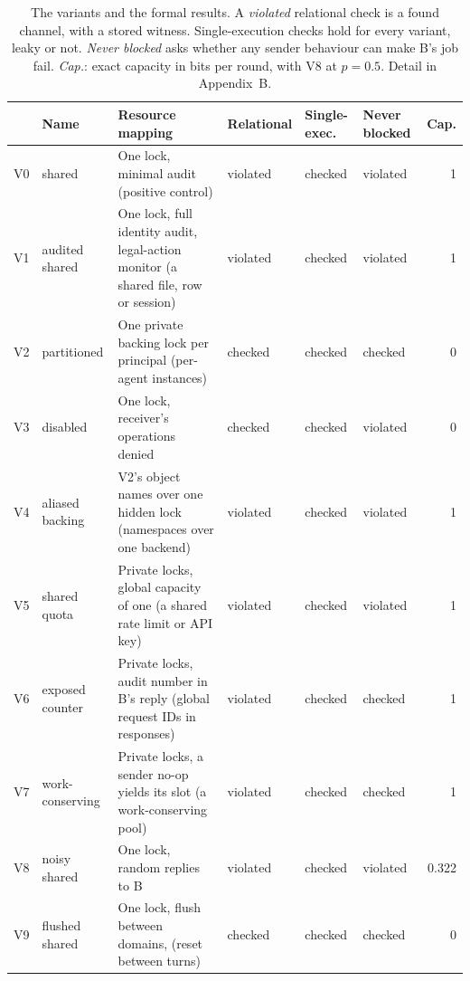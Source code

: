 \begin{table}[!t]
\centering\footnotesize
\caption{The variants and the formal results. A \emph{violated} relational check is a found channel, with a stored witness. Single-execution checks hold for every variant, leaky or not. \emph{Never blocked} asks whether any sender behaviour can make B's job fail. \emph{Cap.}: exact capacity in bits per round, with V8 at $p=0.5$. Detail in Appendix~B.}
\label{tab:variants}
\setlength{\tabcolsep}{3pt}
\begin{tabularx}{\textwidth}{@{}l l Y l l l r@{}}
\toprule
& \textbf{Name} & \textbf{Resource mapping} & \textbf{Relational} & \textbf{Single-exec.} & \textbf{Never blocked} & \textbf{Cap.}\\
\midrule
V0 & shared & One lock, minimal audit (positive control) & violated & checked & violated & 1 \\
V1 & audited shared & One lock, full identity audit, legal-action monitor (a shared file, row or session) & violated & checked & violated & 1 \\
V2 & partitioned & One private backing lock per principal (per-agent instances) & checked & checked & checked & 0 \\
V3 & disabled & One lock, receiver's operations denied & checked & checked & violated & 0 \\
V4 & aliased backing & V2's object names over one hidden lock (namespaces over one backend) & violated & checked & violated & 1 \\
V5 & shared quota & Private locks, global capacity of one (a shared rate limit or API key) & violated & checked & violated & 1 \\
V6 & exposed counter & Private locks, audit number in B's reply (global request IDs in responses) & violated & checked & checked & 1 \\
V7 & work-conserving & Private locks, a sender no-op yields its slot (a work-conserving pool) & violated & checked & checked & 1 \\
V8 & noisy shared & One lock, random  replies to B & violated & checked & violated & 0.322 \\
V9 & flushed shared & One lock, flush between domains,  (reset between turns) & checked & checked & checked & 0 \\
\bottomrule
\end{tabularx}
\end{table}
